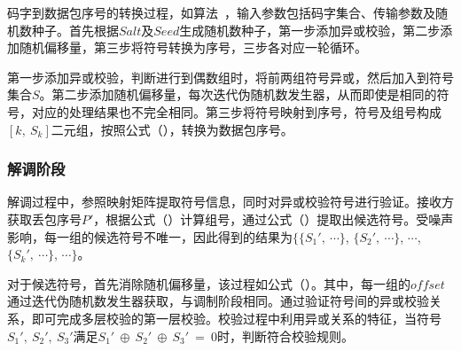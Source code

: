 码字到数据包序号的转换过程，如算法\ ，输入参数包括码字集合、传输参数及随机数种子。首先根据$Salt$及$Seed$生成随机数种子，第一步添加异或校验，第二步添加随机偏移量，第三步将符号转换为序号，三步各对应一轮循环。

第一步添加异或校验，判断进行到偶数组时，将前两组符号异或，然后加入到符号集合$S$。第二步添加随机偏移量，每次迭代伪随机数发生器，从而即使是相同的符号，对应的处理结果也不完全相同。第三步将符号映射到序号，符号及组号构成$[k,\ S_{k}]$二元组，按照公式（），转换为数据包序号。

\subsubsection{解调阶段}
\label{chap:hash:robustness:xor:demodulation}

解调过程中，参照映射矩阵提取符号信息，同时对异或校验符号进行验证。接收方获取丢包序号$P'$，根据公式（）计算组号，通过公式（）提取出候选符号。受噪声影响，每一组的候选符号不唯一，因此得到的结果为$\{\{S_1',\ \cdots\}$, $\{S_2',\ \cdots\}$, $\cdots$, $\{S_k',\ \cdots\}$, $\cdots\}$。

对于候选符号，首先消除随机偏移量，该过程如公式（）。其中，每一组的$offset$通过迭代伪随机数发生器获取，与调制阶段相同。通过验证符号间的异或校验关系，即可完成多层校验的第一层校验。校验过程中利用异或关系的特征，当符号$S_1',\ S_2',\ S_3'$满足$S_1'\ \oplus\ S_2'\ \oplus\ S_3'\ =\ 0$时，判断符合校验规则。